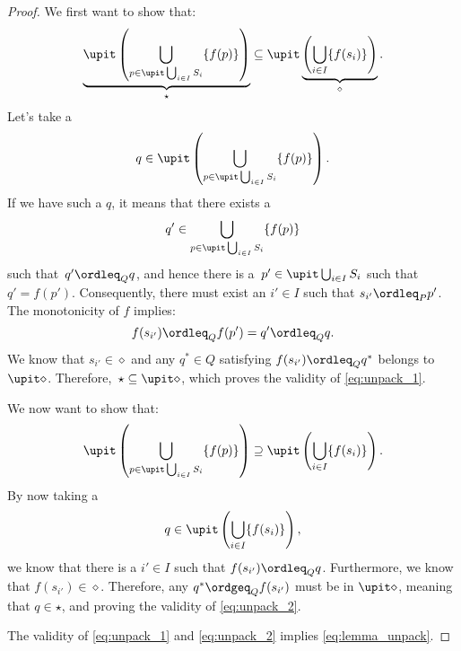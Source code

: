 \begin{proof}
    We first want to show that:
    \begin{equation}
        \label{eq:unpack_1}
        \underbrace{\upit \left(\bigcup_{p\in \upit \bigcup_{i\in I}S_i}\{f(p)\} \right)}_{\star}\subseteq \upit \underbrace{\left( \bigcup_{i\in I}\{f(s_i)\}\right)}_{\diamond}.
    \end{equation}
    Let's take a
    \begin{equation}
        q\in \upit\left( \bigcup_{p\in \upit \bigcup_{i\in I}S_i}\{f(p)\}\right).
    \end{equation}
    If we have such a $q$, it means that there exists a
    \begin{equation}
        q'\in \bigcup_{p\in \upit\bigcup_{i\in I}S_i}\{f(p)\}
    \end{equation}
    such that~$q'\ordleq_Q q$, and hence there is a~$p'\in \upit \bigcup_{i\in I} S_i$ such that $q'=f(p')$. Consequently, there must exist an $i'\in I$ such that $s_{i'}\ordleq_P p'$. The monotonicity of $f$ implies:
    \begin{equation}
        f(s_{i'})\ordleq_Q f(p')=q'\ordleq_Q q.
    \end{equation}
    We know that $s_{i'}\in \diamond$ and any $q^*\in Q$ satisfying $f(s_{i'})\ordleq_Q q^*$ belongs to $\upit \diamond$. Therefore,~$\star\subseteq \upit \diamond$, which proves the validity of \cref{eq:unpack_1}.

    We now want to show that:
    \begin{equation}
        \label{eq:unpack_2}
        \upit \left(\bigcup_{p\in \upit \bigcup_{i\in I}S_i}\{f(p)\} \right)\supseteq \upit \left( \bigcup_{i\in I}\{f(s_i)\}\right).
    \end{equation}
    By now taking a
    \begin{equation}
        q\in \upit \left( \bigcup_{i\in I}\{f(s_i)\}\right),
    \end{equation}
    we know that there is a $i'\in I$ such that $f(s_{i'})\ordleq_Q q$. Furthermore, we know that $f(s_{i'})\in \diamond$. Therefore, any $q^*\ordgeq_Q f(s_{i'})$ must be in $\upit \diamond$, meaning that $q\in \star$, and proving the validity of \cref{eq:unpack_2}.

    The validity of \cref{eq:unpack_1} and \cref{eq:unpack_2} implies \cref{eq:lemma_unpack}.
\end{proof}

